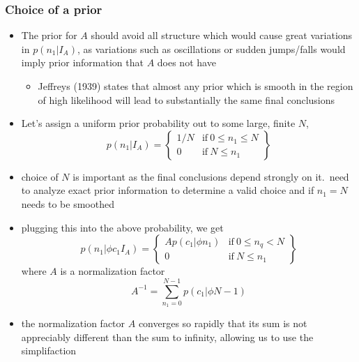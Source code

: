 \documentclass[../jaynes_prob_theory_notes.tex]{subfiles}
\begin{document}
    \subsubsection{Choice of a prior}
        \begin{itemize}
            \item The prior for $A$ should avoid all structure which would cause great variations in $p(n_1|I_A)$, as variations such as oscillations or sudden jumps/falls would imply prior information that $A$ does not have
                \begin{itemize}
                    \item Jeffreys (1939) states that almost any prior which is smooth in the region of high likelihood will lead to substantially the same final conclusions
                \end{itemize}
            \item Let's assign a uniform prior probability out to some large, finite $N$,
                \begin{equation*}
                    p(n_1|I_A) = \left \{ \begin{matrix} 1/N & \mathrm{if}~0 \leq n_1 \leq N \\ 0 & \mathrm{if}~N \leq n_1 \end{matrix} \right \}
                \end{equation*}
            \item choice of $N$ is important as the final conclusions depend strongly on it.\ need to analyze exact prior information to determine a valid choice and if $n_1 = N$ needs to be smoothed
            \item plugging this into the above probability, we get
                \begin{equation*}
                    p(n_1|{\phi}c_{1}I_{A}) = \left \{ \begin{matrix} Ap(c_1|{\phi}n_1) & \mathrm{if}~0 \leq n_q < N \\ 0 & \mathrm{if}~N \leq n_1 \end{matrix} \right \}
                \end{equation*}
                where $A$ is a normalization factor
                \begin{equation*}
                    A^{-1} = \sum_{n_1 = 0}^{N-1} p(c_1|{\phi}N-1)
                \end{equation*}
            \item the normalization factor $A$ converges so rapidly that its sum is not appreciably different than the sum to infinity, allowing us to use the simplifaction

\end{itemize}
\end{document}
